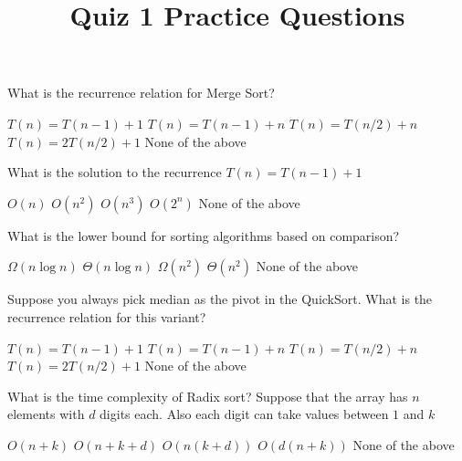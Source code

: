 \documentclass[addpoints,12pt]{exam}
\begin{document}
\title{Quiz 1 Practice Questions}
\author{}
\date{}
\maketitle

\newcommand{\hint}[1]{\\{\bf Hint:} {\em {#1}}}





\begin{questions}
\qformat{[M\thequestion]}
\question
What is the recurrence relation for Merge Sort?
\begin{choices}
\choice $T(n) = T(n-1) + 1$
\choice $T(n) = T(n-1) + n$
\choice $T(n) = T(n/2) + n$
\choice $T(n) = 2T(n/2) + 1$
\choice None of the above 
\end{choices}



\question
What is the solution to the recurrence $T(n) = T(n-1) + 1$
\begin{choices}
\choice $O(n)$
\choice $O(n^2)$
\choice $O(n^3)$
\choice $O(2^n)$
\choice None of the above 
\end{choices}



\question
What is the lower bound for sorting algorithms based on comparison?
\begin{choices}
\choice $\Omega(n \log n)$
\choice $\Theta(n \log n)$
\choice $\Omega(n^2)$
\choice $\Theta(n^2)$
\choice None of the above 
\end{choices}



\question
Suppose you always pick median as the pivot in the QuickSort. What is the recurrence relation for this variant?
\begin{choices}
\choice $T(n) = T(n-1) + 1$
\choice $T(n) = T(n-1) + n$
\choice $T(n) = T(n/2) + n$
\choice $T(n) = 2T(n/2) + 1$
\choice None of the above 
\end{choices}



\question
What is the time complexity of Radix sort? Suppose that the array has $n$ elements with $d$ digits each. Also each digit can take values between $1$ and $k$
\begin{choices}
\choice $O(n+k)$
\choice $O(n+k+d)$ 
\choice $O(n(k+d))$
\choice $O(d(n+k))$
\choice None of the above 
\end{choices}
\end{questions}
\end{document}
